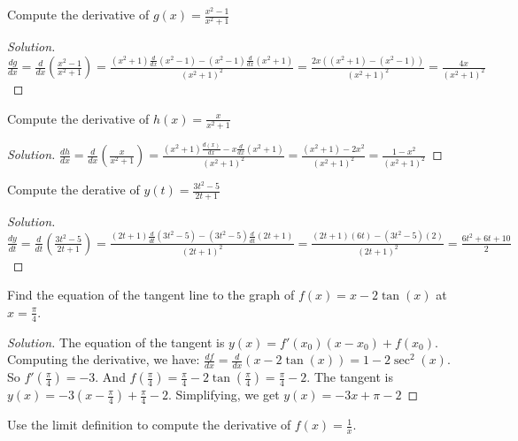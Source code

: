 \documentclass[crop=false,class=book,oneside]{standalone}
\begin{document}
            \begin{problem}
            Compute the derivative of $g(x)=\frac{x^{2}-1}{x^{2}+1}$
            \end{problem}
            \begin{proof}[Solution]
            $\frac{dg}{dx}=\frac{d}{dx}(\frac{x^{2}-1}{x^{2}+1})=\frac{(x^{2}+1)\frac{d}{dx}(x^{2}-1)-(x^{2}-1)\frac{d}{dx}(x^{2}+1)}{(x^{2}+1)^{2}}=\frac{2x((x^{2}+1)-(x^{2}-1))}{(x^{2}+1)^{2}}=\frac{4x}{(x^{2}+1)^{2}}$
            \end{proof}
            \begin{problem}
            Compute the derivative of $h(x)=\frac{x}{x^{2}+1}$
            \end{problem}
            \begin{proof}[Solution]
            $\frac{dh}{dx}=\frac{d}{dx}(\frac{x}{x^{2}+1})=\frac{(x^{2}+1)\frac{d(x)}{dx}-x\frac{d}{dx}(x^{2}+1)}{(x^{2}+1)^{2}}=\frac{(x^{2}+1)-2x^{2}}{(x^{2}+1)^{2}}=\frac{1-x^{2}}{(x^{2}+1)^{2}}$
            \end{proof}
            \begin{problem}
            Compute the derative of $y(t)=\frac{3t^{2}-5}{2t+1}$
            \end{problem}
            \begin{proof}[Solution]
            $\frac{dy}{dt}=\frac{d}{dt}(\frac{3t^{2}-5}{2t+1})=\frac{(2t+1)\frac{d}{dt}(3t^{2}-5)-(3t^{2}-5)\frac{d}{dt}(2t+1)}{(2t+1)^{2}}=\frac{(2t+1)(6t)-(3t^{2}-5)(2)}{(2t+1)^{2}}=\frac{6t^{2}+6t+10}{2}$
            \end{proof}
            \begin{problem}
            Find the equation of the tangent line to the graph of $f(x)=x-2\tan(x)$ at $x=\frac{\pi}{4}$.
            \end{problem}
            \begin{proof}[Solution]
            The equation of the tangent is $y(x)=f'(x_{0})(x-x_{0})+f(x_{0})$. Computing the derivative, we have: $\frac{df}{dx}=\frac{d}{dx}(x-2\tan(x))=1-2\sec^{2}(x)$. So $f'(\frac{\pi}{4})=-3$. And $f(\frac{\pi}{4})=\frac{\pi}{4}-2\tan(\frac{\pi}{4})=\frac{\pi}{4}-2$. The tangent is $y(x)=-3(x-\frac{\pi}{4})+\frac{\pi}{4}-2$. Simplifying, we get $y(x)=-3x+\pi-2$
            \end{proof}
            \newpage
            \begin{problem}
            Use the limit definition to compute the derivative of $f(x)=\frac{1}{x}$.
            \end{problem}
\end{document}

